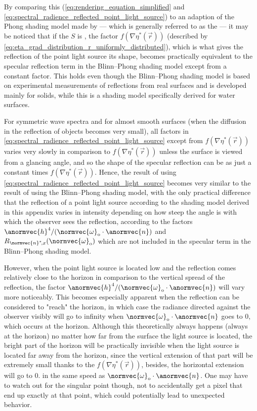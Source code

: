 By comparing this  ( \ref{eq:rendering_equation_simplified} and \ref{eq:spectral_radience_reflected_point_light_source}) to an adaption of the Phong shading model \citep{Phong1975} made by \citet{Blinn1977} --- which is generally referred to as the  --- it may be noticed that if the  $S$ is , the factor $f(\nabla\eta^*(\vec{r}))$ (described by \eqref{eq:eta_grad_distribution_r_uniformly_distributed}), which is what gives the reflection of the point light source its shape, becomes practically equivalent to the specular reflection term in the Blinn--Phong shading model except from a constant factor. This holds even though the Blinn--Phong shading model is based on experimental measurements of reflections from real surfaces and is developed mainly for solids, while this is a shading model specifically derived for water surfaces.

For symmetric wave spectra and for almost smooth surfaces (when the diffusion in the reflection of objects becomes very small), all factors in \eqref{eq:spectral_radience_reflected_point_light_source} except from $f(\nabla\eta^*(\vec{r}))$ varies very slowly in comparison to $f(\nabla\eta^*(\vec{r}))$ unless the surface is viewed from a glancing angle, and so the shape of the specular reflection can be \approximated as just a constant times $f(\nabla\eta^*(\vec{r}))$. Hence, the result of using \eqref{eq:spectral_radience_reflected_point_light_source} becomes very similar to the result of using the Blinn--Phong shading model, with the only practical difference that the reflection of a point light source according to the shading model derived in this appendix varies in intensity depending on how steep the angle is with which the observer sees the reflection, according to the factors $\anormvec{h}^4/(\normvec{\omega}_{\text{o}}\cdot\anormvec{n})$ and $R_{\normvec{n}^*\!,x}(\normvec{\omega}_{\text{o}})$ which are not included in the specular term in the Blinn--Phong shading model.

However, when the point light source is located low and the reflection comes relatively close to the horizon in comparison to the vertical spread of the reflection, the factor $\anormvec{h}^4/(\normvec{\omega}_{\text{o}}\cdot\anormvec{n})$ will vary more noticeably. This becomes especially apparent when the reflection can be considered to "reach" the horizon, in which case the radiance directed against the observer visibly will go to infinity when $\normvec{\omega}_{\text{o}}\cdot\anormvec{n}$ goes to 0, which occurs at the horizon. Although this theoretically always happens (always at the horizon) no matter how far from the surface the light source is located, the bright part of the horizon will be practically invisible when the light source is located far away from the horizon, since the vertical extension of that part will be extremely small thanks to the $f(\nabla\eta^*(\vec{r}))$, besides, the horizontal extension will go to 0. in the same speed as $\normvec{\omega}_{\text{o}}\cdot\anormvec{n}$. One may have to watch out for the singular point though, not to accidentally get a pixel that end up exactly at that point, which could potentially lead to unexpected behavior.